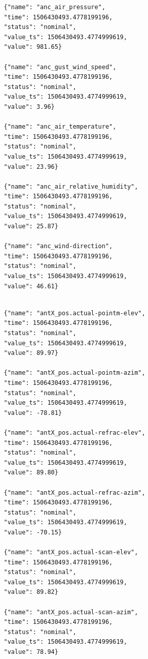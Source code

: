 \begin{tcolorbox}
\begin{lstlisting}
   {"name": "anc_air_pressure",
   "time": 1506430493.4778199196,
   "status": "nominal",
   "value_ts": 1506430493.4774999619,
   "value": 981.65}
   
   {"name": "anc_gust_wind_speed",
   "time": 1506430493.4778199196,
   "status": "nominal",
   "value_ts": 1506430493.4774999619,
   "value": 3.96}

   {"name": "anc_air_temperature",
   "time": 1506430493.4778199196,
   "status": "nominal",
   "value_ts": 1506430493.4774999619,
   "value": 23.96}

   {"name": "anc_air_relative_humidity",
   "time": 1506430493.4778199196,
   "status": "nominal",
   "value_ts": 1506430493.4774999619,
   "value": 25.87}

   {"name": "anc_wind-direction",
   "time": 1506430493.4778199196,
   "status": "nominal",
   "value_ts": 1506430493.4774999619,
   "value": 46.61}
  
\end{lstlisting}
\end{tcolorbox}

\begin{tcolorbox}
\begin{lstlisting}
   {"name": "antX_pos.actual-pointm-elev",
   "time": 1506430493.4778199196,
   "status": "nominal",
   "value_ts": 1506430493.4774999619,
   "value": 89.97}
   
   {"name": "antX_pos.actual-pointm-azim",
   "time": 1506430493.4778199196,
   "status": "nominal",
   "value_ts": 1506430493.4774999619,
   "value": -78.81}
   
   {"name": "antX_pos.actual-refrac-elev",
   "time": 1506430493.4778199196,
   "status": "nominal",
   "value_ts": 1506430493.4774999619,
   "value": 89.80}
   
   {"name": "antX_pos.actual-refrac-azim",
   "time": 1506430493.4778199196,
   "status": "nominal",
   "value_ts": 1506430493.4774999619,
   "value": -70.15}
   
   {"name": "antX_pos.actual-scan-elev",
   "time": 1506430493.4778199196,
   "status": "nominal",
   "value_ts": 1506430493.4774999619,
   "value": 89.82}
   
   {"name": "antX_pos.actual-scan-azim",
   "time": 1506430493.4778199196,
   "status": "nominal",
   "value_ts": 1506430493.4774999619,
   "value": 78.94}
   
\end{lstlisting}
\end{tcolorbox}

